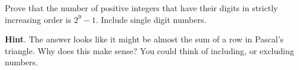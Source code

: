 \documentclass{book}
\begin{document}
\setcounter{cpjt}{97}
\addtocounter{cpjt}{-1}
\begin{activity}\label{activity-90}
\hypertarget{p-689}{}%
Prove that the number of positive integers that have their digits in strictly increasing order is \(2^{9} - 1\). Include single digit numbers.%
\par\smallskip%
\noindent\textbf{Hint}.\hypertarget{hint-51}{}\quad%
\hypertarget{p-690}{}%
The answer looks like it might be almost the sum of a row in Pascal's triangle.  Why does this make sense?  You could think of including, or excluding numbers.%
\par\smallskip%
\noindent\end{activity}

\clearpage
\end{document}
